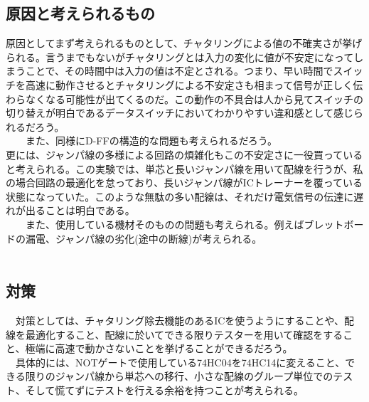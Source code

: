 \documentclass{scrartcl}
\begin{document}
\subsection{原因と考えられるもの}
\label{sec:orgbee7ee8}

    原因としてまず考えられるものとして、チャタリングによる値の不確実さが挙げられる。言うまでもないがチャタリングとは入力の変化に値が不安定になってしまうことで、その時間中は入力の値は不定とされる。つまり、早い時間でスイッチを高速に動作させるとチャタリングによる不安定さも相まって信号が正しく伝わらなくなる可能性が出てくるのだ。この動作の不具合は人から見てスイッチの切り替えが明白であるデータスイッチにおいてわかりやすい違和感として感じられるだろう。\\
　　また、同様にD-FFの構造的な問題も考えられるだろう。\\
    更には、ジャンパ線の多様による回路の煩雑化もこの不安定さに一役買っていると考えられる。この実験では、単芯と長いジャンパ線を用いて配線を行うが、私の場合回路の最適化を怠っており、長いジャンパ線がICトレーナーを覆っている状態になっていた。このような無駄の多い配線は、それだけ電気信号の伝達に遅れが出ることは明白である。\\
　　また、使用している機材そのものの問題も考えられる。例えばブレットボードの漏電、ジャンパ線の劣化(途中の断線)が考えられる。\\
　　\\

\subsection{対策}
\label{sec:orgc28c399}

　対策としては、チャタリング除去機能のあるICを使うようにすることや、配線を最適化すること、配線に於いてできる限りテスターを用いて確認をすること、極端に高速で動かさないことを挙げることができるだろう。\\
　具体的には、NOTゲートで使用している74HC04を74HC14に変えること、できる限りのジャンパ線から単芯への移行、小さな配線のグループ単位でのテスト、そして慌てずにテストを行える余裕を持つことが考えられる。\\
\end{document}
